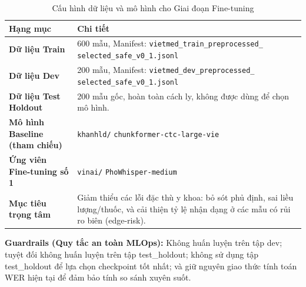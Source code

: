\documentclass[12pt,a4paper]{article}
\begin{document}
\begin{table}[h]
\centering
\caption{Cấu hình dữ liệu và mô hình cho Giai đoạn Fine-tuning}
\begin{tabularx}{\textwidth}{|l|X|}
\hline
\textbf{Hạng mục} & \textbf{Chi tiết} \\
\hline
\textbf{Dữ liệu Train} & 600 mẫu, Manifest: \newline \texttt{vietmed\_train\_preprocessed\_} \newline \texttt{selected\_safe\_v0\_1.jsonl} \\
\hline
\textbf{Dữ liệu Dev} & 200 mẫu, Manifest: \newline \texttt{vietmed\_dev\_preprocessed\_} \newline \texttt{selected\_safe\_v0\_1.jsonl} \\
\hline
\textbf{Dữ liệu Test Holdout} & 200 mẫu gốc, hoàn toàn cách ly, không được dùng để chọn mô hình. \\
\hline
\textbf{Mô hình Baseline (tham chiếu)} & \texttt{khanhld/} \newline \texttt{chunkformer-ctc-large-vie} \\
\hline
\textbf{Ứng viên Fine-tuning số 1} & \texttt{vinai/} \newline \texttt{PhoWhisper-medium} \\
\hline
\textbf{Mục tiêu trọng tâm} & Giảm thiểu các lỗi đặc thù y khoa: bỏ sót phủ định, sai liều lượng/thuốc, và cải thiện tỷ lệ nhận dạng ở các mẫu có rủi ro biên (edge-risk). \\
\hline
\end{tabularx}
\end{table}

\textbf{Guardrails (Quy tắc an toàn MLOps):} Không huấn luyện trên tập dev; tuyệt đối không huấn luyện trên tập test\_holdout; không sử dụng tập test\_holdout để lựa chọn checkpoint tốt nhất; và giữ nguyên giao thức tính toán WER hiện tại để đảm bảo tính so sánh xuyên suốt.
\end{document}
